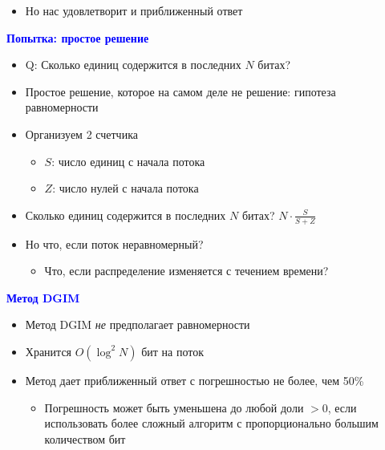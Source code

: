 \documentclass[landscape]{slides}
\begin{document}
\begin{normalsize}
\begin{slide}
\begin{itemize}
\item Но нас удовлетворит и приближенный ответ
\end{itemize}
\end{slide}


\begin{slide}
\textbf{\textcolor{blue}{Попытка: простое решение}}

\begin{itemize}
\item Q: Сколько единиц содержится в последних $N$ битах?

\item Простое решение, которое на самом деле не решение: гипотеза равномерности

\item Организуем 2 счетчика
 
  \begin{itemize}
  \item $S$: число единиц с начала потока

  \item $Z$: число нулей с начала потока
  \end{itemize}

\item Сколько единиц содержится в последних $N$ битах? $N \cdot \frac{S}{S+Z}$

\item Но что, если поток неравномерный?

  \begin{itemize}
  \item Что, если распределение изменяется с течением времени?
  \end{itemize}
\end{itemize}
\end{slide}


\begin{slide}
\textbf{\textcolor{blue}{Метод DGIM}}


\begin{itemize}
\item Метод DGIM {\em не} предполагает равномерности

\item Хранится $O(\log^2 N)$ бит на поток

\item Метод дает приближенный ответ с погрешностью не более, чем 50\%

  \begin{itemize}
  \item Погрешность может быть уменьшена до любой доли $>0$, если использовать более сложный алгоритм с пропорционально большим количеством бит
  \end{itemize}
\end{itemize}
\end{slide}



\end{normalsize}
\end{document}
